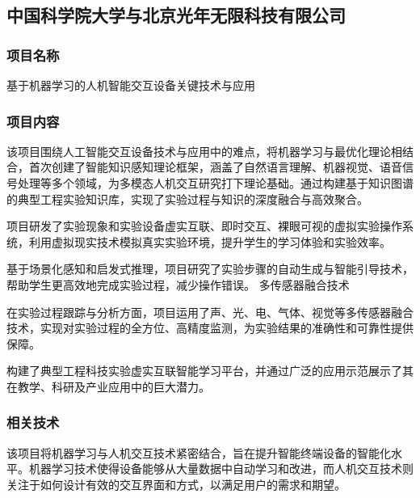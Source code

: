 
\subsection{中国科学院大学与北京光年无限科技有限公司}\label{中国科学院大学与北京光年无限科技有限公司}

\subsubsection{项目名称}

基于机器学习的人机智能交互设备关键技术与应用

\subsubsection{项目内容}


该项目围绕人工智能交互设备技术与应用中的难点，将机器学习与最优化理论相结合，首次创建了智能知识感知理论框架，涵盖了自然语言理解、机器视觉、语音信号处理等多个领域，为多模态人机交互研究打下理论基础。通过构建基于知识图谱的典型工程实验知识库，实现了实验过程与知识的深度融合与高效聚合。


项目研发了实验现象和实验设备虚实互联、即时交互、裸眼可视的虚拟实验操作系统，利用虚拟现实技术模拟真实实验环境，提升学生的学习体验和实验效率。


基于场景化感知和启发式推理，项目研究了实验步骤的自动生成与智能引导技术，帮助学生更高效地完成实验过程，减少操作错误。
多传感器融合技术

在实验过程跟踪与分析方面，项目运用了声、光、电、气体、视觉等多传感器融合技术，实现对实验过程的全方位、高精度监测，为实验结果的准确性和可靠性提供保障。


构建了典型工程科技实验虚实互联智能学习平台，并通过广泛的应用示范展示了其在教学、科研及产业应用中的巨大潜力。

\subsubsection{相关技术}



该项目将机器学习与人机交互技术紧密结合，旨在提升智能终端设备的智能化水平。机器学习技术使得设备能够从大量数据中自动学习和改进，而人机交互技术则关注于如何设计有效的交互界面和方式，以满足用户的需求和期望。

